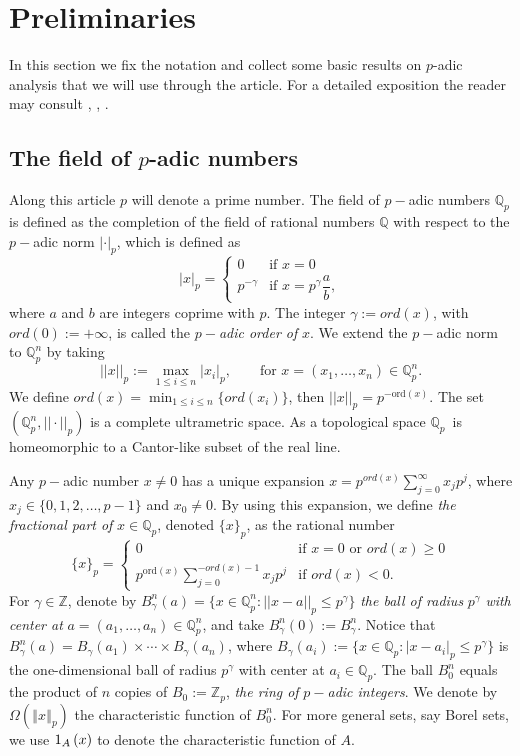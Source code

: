 \documentclass{amsart}\usepackage{amsfonts}
\theoremstyle{plain}
\numberwithin{equation}{section}
\begin{document}
\section{\label{Section1}Preliminaries}

In this section we fix the notation and collect some basic results on $p$-adic
analysis that we will use through the article. For a detailed exposition the
reader may consult \cite{A-K-S}, \cite{Taibleson}, \cite{V-V-Z}.

\subsection{The field of $p$-adic numbers}

Along this article $p$ will denote a prime number. The field of $p-$adic
numbers $\mathbb{Q}_{p}$ is defined as the completion of the field of rational
numbers $\mathbb{Q}$ with respect to the $p-$adic norm $|\cdot|_{p}$, which is
defined as
\[
|x|_{p}=\begin{cases}
0 & \text{if }x=0\\
p^{-\gamma} & \text{if }x=p^{\gamma}\dfrac{a}{b},
\end{cases}
\]
where $a$ and $b$ are integers coprime with $p$. The integer $\gamma:=ord(x)$,
with $ord(0):=+\infty$, is called the\textit{ }$p-$\textit{adic order of} $x$.
We extend the $p-$adic norm to $\mathbb{Q}_{p}^{n}$ by taking\[
||x||_{p}:=\max_{1\leq i\leq n}|x_{i}|_{p},\qquad\text{for }x=(x_{1},\dots,x_{n})\in\mathbb{Q}_{p}^{n}.
\]
We define $ord(x)=\min_{1\leq i\leq n}\{ord(x_{i})\}$, then $||x||_{p}=p^{-\text{ord}(x)}$. The set $\left(  \mathbb{Q}_{p}^{n},||\cdot
||_{p}\right)  $ is a complete ultrametric space. As a topological space
$\mathbb{Q}_{p}$\ is homeomorphic to a Cantor-like subset of the real line.

Any $p-$adic number $x\neq0$ has a unique expansion $x=p^{ord(x)}\sum
_{j=0}^{\infty}x_{j}p^{j}$, where $x_{j}\in\{0,1,2,\dots,p-1\}$ and $x_{0}\neq0$. By using this expansion, we define \textit{the fractional part of
}$x\in\mathbb{Q}_{p}$, denoted $\{x\}_{p}$, as the rational number
\[
\{x\}_{p}=\begin{cases}
0 & \text{if }x=0\text{ or }ord(x)\geq0\\
p^{\text{ord}(x)}\sum_{j=0}^{-ord(x)-1}x_{j}p^{j} & \text{if }ord(x)<0.
\end{cases}
\]
For $\gamma\in\mathbb{Z}$, denote by $B_{\gamma}^{n}(a)=\{x\in\mathbb{Q}_{p}^{n}:||x-a||_{p}\leq p^{\gamma}\}$ \textit{the ball of radius }$p^{\gamma
}$ \textit{with center at} $a=(a_{1},\dots,a_{n})\in\mathbb{Q}_{p}^{n}$, and
take $B_{\gamma}^{n}(0):=B_{\gamma}^{n}$. Notice that $B_{\gamma}^{n}(a)=B_{\gamma}(a_{1})\times\cdots\times B_{\gamma}(a_{n})$, where
$B_{\gamma}(a_{i}):=\{x\in\mathbb{Q}_{p}:|x-a_{i}|_{p}\leq p^{\gamma}\}$ is
the one-dimensional ball of radius $p^{\gamma}$ with center at $a_{i}\in\mathbb{Q}_{p}$. The ball $B_{0}^{n}$ equals the product of $n$ copies of
$B_{0}:=\mathbb{Z}_{p}$, \textit{the ring of }$p-$\textit{adic integers}. We
denote by $\Omega(\left\Vert x\right\Vert _{p})$ the characteristic function
of $B_{0}^{n}$. For more general sets, say Borel sets, we use ${\LARGE 1}_{A}\left(  x\right)  $ to denote the characteristic function of $A$.
\end{document}
